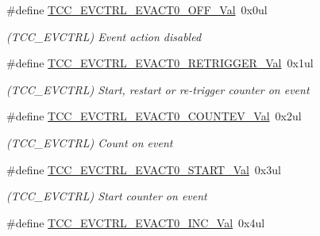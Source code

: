 \begin{DoxyCompactItemize}
\item 
\hypertarget{group___s_a_m_l21___t_c_c_ga3ba8b3dc891abf550f7eb01b234ef5c6}{}\#define \hyperlink{group___s_a_m_l21___t_c_c_ga3ba8b3dc891abf550f7eb01b234ef5c6}{T\+C\+C\+\_\+\+E\+V\+C\+T\+R\+L\+\_\+\+E\+V\+A\+C\+T0\+\_\+\+O\+F\+F\+\_\+\+Val}~0x0ul\label{group___s_a_m_l21___t_c_c_ga3ba8b3dc891abf550f7eb01b234ef5c6}

\begin{DoxyCompactList}\small\item\em (T\+C\+C\+\_\+\+E\+V\+C\+T\+R\+L) Event action disabled \end{DoxyCompactList}\item 
\hypertarget{group___s_a_m_l21___t_c_c_gac94dcc9808c0c323536a36ef19cc04d4}{}\#define \hyperlink{group___s_a_m_l21___t_c_c_gac94dcc9808c0c323536a36ef19cc04d4}{T\+C\+C\+\_\+\+E\+V\+C\+T\+R\+L\+\_\+\+E\+V\+A\+C\+T0\+\_\+\+R\+E\+T\+R\+I\+G\+G\+E\+R\+\_\+\+Val}~0x1ul\label{group___s_a_m_l21___t_c_c_gac94dcc9808c0c323536a36ef19cc04d4}

\begin{DoxyCompactList}\small\item\em (T\+C\+C\+\_\+\+E\+V\+C\+T\+R\+L) Start, restart or re-\/trigger counter on event \end{DoxyCompactList}\item 
\hypertarget{group___s_a_m_l21___t_c_c_ga166eaa972b7e6f66387006941134d028}{}\#define \hyperlink{group___s_a_m_l21___t_c_c_ga166eaa972b7e6f66387006941134d028}{T\+C\+C\+\_\+\+E\+V\+C\+T\+R\+L\+\_\+\+E\+V\+A\+C\+T0\+\_\+\+C\+O\+U\+N\+T\+E\+V\+\_\+\+Val}~0x2ul\label{group___s_a_m_l21___t_c_c_ga166eaa972b7e6f66387006941134d028}

\begin{DoxyCompactList}\small\item\em (T\+C\+C\+\_\+\+E\+V\+C\+T\+R\+L) Count on event \end{DoxyCompactList}\item 
\hypertarget{group___s_a_m_l21___t_c_c_gac05e5e8615b0fb5dcb90eb1c8eb4b8fe}{}\#define \hyperlink{group___s_a_m_l21___t_c_c_gac05e5e8615b0fb5dcb90eb1c8eb4b8fe}{T\+C\+C\+\_\+\+E\+V\+C\+T\+R\+L\+\_\+\+E\+V\+A\+C\+T0\+\_\+\+S\+T\+A\+R\+T\+\_\+\+Val}~0x3ul\label{group___s_a_m_l21___t_c_c_gac05e5e8615b0fb5dcb90eb1c8eb4b8fe}

\begin{DoxyCompactList}\small\item\em (T\+C\+C\+\_\+\+E\+V\+C\+T\+R\+L) Start counter on event \end{DoxyCompactList}\item 
\hypertarget{group___s_a_m_l21___t_c_c_ga8429cef464b00f7c6bbc13a587375689}{}\#define \hyperlink{group___s_a_m_l21___t_c_c_ga8429cef464b00f7c6bbc13a587375689}{T\+C\+C\+\_\+\+E\+V\+C\+T\+R\+L\+\_\+\+E\+V\+A\+C\+T0\+\_\+\+I\+N\+C\+\_\+\+Val}~0x4ul\label{group___s_a_m_l21___t_c_c_ga8429cef464b00f7c6bbc13a587375689}


\end{DoxyCompactItemize}
